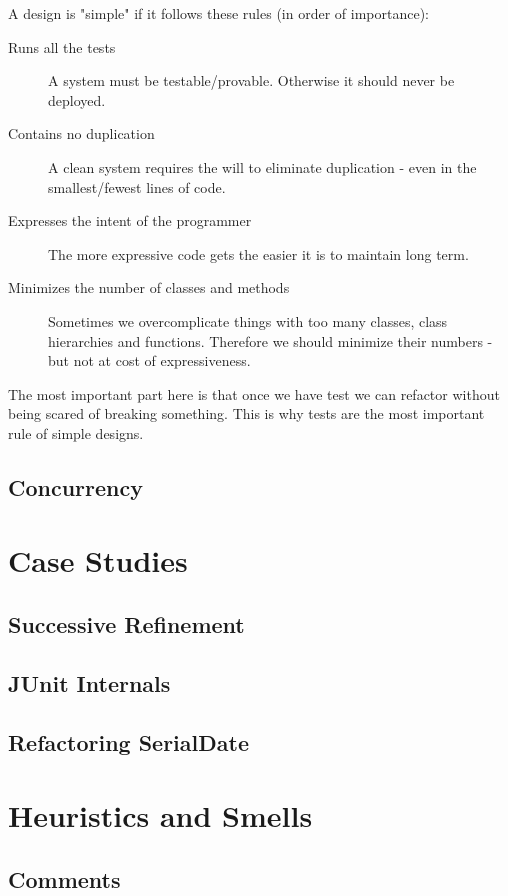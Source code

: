 \documentclass[a4paper, twocolumn]{article}
\begin{document}
A design is "simple" if it follows these rules (in order of importance):
\begin{description}
	\item[Runs all the tests] A system must be testable/provable. Otherwise it should never be deployed.
	\item[Contains no duplication] A clean system requires the will to eliminate duplication - even in the smallest/fewest lines of code.
	\item[Expresses the intent of the programmer] The more expressive code gets the easier it is to maintain long term.
	\item[Minimizes the number of classes and methods] Sometimes we overcomplicate things with too many classes, class hierarchies and functions. Therefore we should minimize their numbers - but not at cost of expressiveness.
\end{description}
The most important part here is that once we have test we can refactor without being scared of breaking something. This is why tests are the most important rule of simple designs.

\subsection{Concurrency}

\section{Case Studies}

\subsection{Successive Refinement}

\subsection{JUnit Internals}

\subsection{Refactoring SerialDate}


\section{Heuristics and Smells}

\subsection{Comments}
\end{document}
